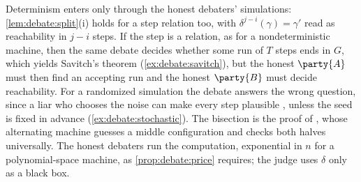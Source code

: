 \begin{refsection}
Determinism enters only through the honest debaters' simulations: \cref{lem:debate:split}(i) holds for a step relation too, with $\delta^{j-i}(\gamma)=\gamma'$ read as reachability in $j-i$ steps. If the step is a relation, as for a nondeterministic machine, then the same debate decides whether some run of $T$ steps ends in $G$, which yields Savitch's theorem (\cref{ex:debate:savitch}), but the honest $\party{A}$ must then find an accepting run and the honest $\party{B}$ must decide reachability. For a randomized simulation the debate answers the wrong question, since a liar who chooses the noise can make every step plausible \parencite[\S5.9]{IrvingEtAl2018}, unless the seed is fixed in advance (\cref{ex:debate:stochastic}). The bisection is the proof of \textcite[Theorem~3.1]{ChandraKozenStockmeyer1981}, whose alternating machine guesses a middle configuration and checks both halves universally. The honest debaters run the computation, exponential in $n$ for a polynomial-space machine, as \cref{prop:debate:price} requires; the judge uses $\delta$ only as a black box.



\end{refsection}
